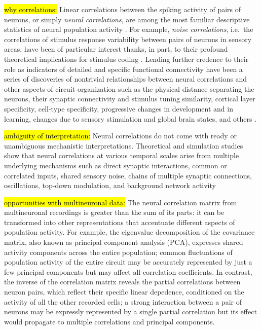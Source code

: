 \hl{\tiny why correlations:}
Linear correlations between the spiking activity of pairs of neurons, or simply \emph{neural correlations}, are among the most familiar descriptive statistics of neural population activity \citep{Cohen:2011}.   
For example, \emph{noise correlations}, i.e.~the correlations of stimulus response variability between pairs of neurons in sensory areas, have been of particular interest thanks, in part, to their profound theoretical implications for stimulus coding \citep{Zohary:1994,Abbott:1999,Averbeck:2006,Berens:2011}.  
Lending further credence to their role as indicators of detailed and specific functional connectivity have been a series of discoveries of nontrivial relationships between neural correlations and other aspects of circuit organization such as the physical distance separating the neurons, their synaptic connectivity and stimulus tuning similarity, cortical layer specificity, cell-type specificity, progressive changes in development and in learning, changes due to sensory stimulation and global brain states, and others \citep{Kohn:2005,Smith:2008,Kohn:2009,Goard:2009,Golshani:2009,Renart:2010,Ecker:2010,Smith:2013,Denman:2013}. 

\hl{\tiny ambiguity of interpretation:}
Neural correlations do not come with ready or unambiguous mechanistic interpretations.   
Theoretical and simulation studies show that neural correlations at various temporal scales arise from multiple underlying mechanisms such as direct synaptic interactions,  common or correlated inputs, shared sensory noise, chains of multiple synaptic connections, oscillations, top-down modulation, and background network activity \citep{Perkel:1967b,Shadlen:1998,Salinas:2001,Ostojic:2009}

\hl{\tiny opportunities with multineuronal data:}
The neural correlation matrix from multineuronal recordings is greater than the sum of its parts: it can be transformed into other representations  that accentuate different aspects of population activity.  
For example, the eigenvalue decomposition of the covariance matrix, also known as principal component analysis (PCA), expresses shared activity components across the entire population;  common fluctuations of population activity of the entire circuit may be accurately represented by just a few principal components but may affect all correlation coefficients. 
In contrast, the inverse of the correlation matrix reveals the partial correlations between neuron pairs, which reflect their specific linear depedence, conditioned on the activity of all the other recorded cells;
a strong interaction between a pair of neurons may be expressly represented by a single partial correlation but its effect would propagate to multiple correlations and principal components.


